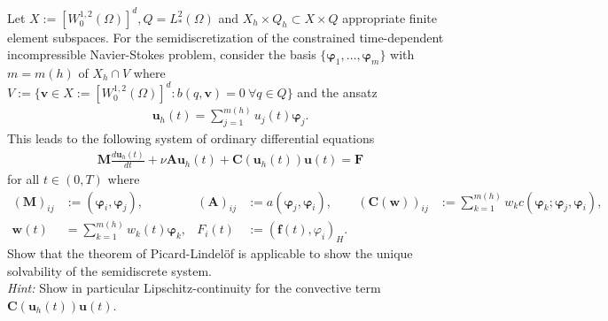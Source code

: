 \documentclass[12pt]{article}
\newcommand{\bu}{\boldsymbol{u}}
\newcommand{\bv}{\boldsymbol{v}}
\newcommand{\bw}{\boldsymbol{w}}
\newenvironment{exercise}[2][Exercise]{\begin{trivlist}
\item[\hskip \labelsep {\bfseries #1}\hskip \labelsep {\bfseries #2.}]}{\end{trivlist}}
\begin{document}
\begin{exercise}{19}
Let $X := [W_0^{1,2}(\Omega)]^d , Q = L^2_* (\Omega)$ and $X_h \times Q_h \subset X \times Q$ appropriate finite element subspaces. 
For the semidiscretization of the constrained time-dependent incompressible Navier-Stokes problem, consider the basis
$\{\boldsymbol{\varphi}_1 , \dots, \boldsymbol{\varphi}_m \}$ with $m = m(h)$ of $X_h \cap V$ where $V := \{\bv \in X := [W_0^{1,2}(\Omega)]^d : b(q, \bv) = 0 ~ \forall q \in Q\}$
and the ansatz 
\begin{align*}
  \bu_h (t) = \sum_{j=1}^{m(h)} u_j (t)\boldsymbol{\varphi}_j.
\end{align*}
This leads to the following system of ordinary differential equations
\begin{align*}
\boldsymbol{M}\frac{d\bu_h(t)}{dt}+ \nu \boldsymbol{A}\bu_h (t) + \boldsymbol{C}(\bu_h (t))\bu(t) = \boldsymbol{F}
\end{align*}
for all $t \in (0, T)$ where
\begin{align*}
(\boldsymbol{M})_{ij} &:= (\boldsymbol{\varphi}_i , \boldsymbol{\varphi}_j ),&
(\boldsymbol{A})_{ij} &:= a(\boldsymbol{\varphi}_j , \boldsymbol{\varphi}_i ),&
(\boldsymbol{C}(\bw))_{ij} &:= \sum_{k=1}^{m(h)} w_k c(\boldsymbol{\varphi}_k ; \boldsymbol{\varphi}_j , \boldsymbol{\varphi}_i ),\\
\bw(t) &= \sum_{k=1}^{m(h)}w_k (t)\boldsymbol{\varphi}_k , & F_i (t) &:= (\boldsymbol{f} (t), \varphi_i)_H.
\end{align*}
Show that the theorem of Picard-Lindelöf is applicable to show the unique solvability of the semidiscrete
system. \\
\emph{Hint:} Show in particular Lipschitz-continuity for the convective term $\boldsymbol{C}(\bu_h (t))\bu(t)$.
\end{exercise}
\end{document}
